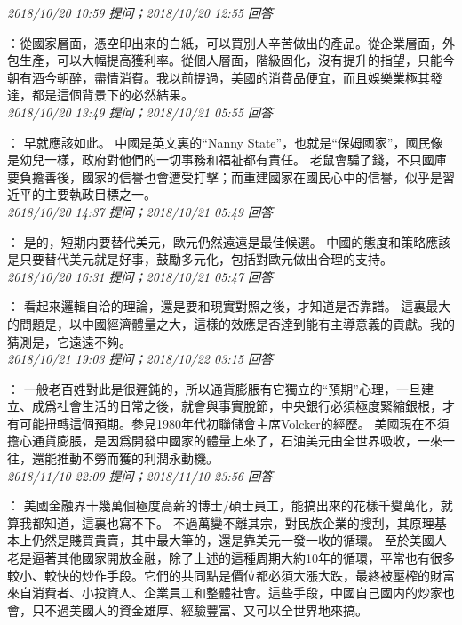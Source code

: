 \documentclass[twocolumn]{ctexart}
\begin{document}
\textit{\hfill\noindent\small 2018/10/20 10:59 提问；2018/10/20 12:55 回答}

：從國家層面，憑空印出來的白紙，可以買別人辛苦做出的產品。從企業層面，外包生產，可以大幅提高獲利率。從個人層面，階級固化，沒有提升的指望，只能今朝有酒今朝醉，盡情消費。我以前提過，美國的消費品便宜，而且娛樂業極其發達，都是這個背景下的必然結果。
\\

\textit{\hfill\noindent\small 2018/10/20 13:49 提问；2018/10/21 05:55 回答}

：
早就應該如此。
中國是英文裏的“Nanny State”，也就是“保姆國家”，國民像是幼兒一樣，政府對他們的一切事務和福祉都有責任。
老鼠會騙了錢，不只國庫要負擔善後，國家的信譽也會遭受打擊；而重建國家在國民心中的信譽，似乎是習近平的主要執政目標之一。
\\

\textit{\hfill\noindent\small 2018/10/20 14:37 提问；2018/10/21 05:49 回答}

：
是的，短期内要替代美元，歐元仍然遠遠是最佳候選。
中國的態度和策略應該是只要替代美元就是好事，鼓勵多元化，包括對歐元做出合理的支持。
\\

\textit{\hfill\noindent\small 2018/10/20 16:31 提问；2018/10/21 05:47 回答}

：
看起來邏輯自洽的理論，還是要和現實對照之後，才知道是否靠譜。
這裏最大的問題是，以中國經濟體量之大，這樣的效應是否達到能有主導意義的貢獻。我的猜測是，它遠遠不夠。
\\

\textit{\hfill\noindent\small 2018/10/21 19:03 提问；2018/10/22 03:15 回答}

：
一般老百姓對此是很遲鈍的，所以通貨膨脹有它獨立的“預期”心理，一旦建立、成爲社會生活的日常之後，就會與事實脫節，中央銀行必須極度緊縮銀根，才有可能扭轉這個預期。參見1980年代初聯儲會主席Volcker的經歷。
美國現在不須擔心通貨膨脹，是因爲開發中國家的體量上來了，石油美元由全世界吸收，一來一往，還能推動不勞而獲的利潤永動機。
\\

\textit{\hfill\noindent\small 2018/11/10 22:09 提问；2018/11/10 23:56 回答}

：
美國金融界十幾萬個極度高薪的博士/碩士員工，能搞出來的花樣千變萬化，就算我都知道，這裏也寫不下。
不過萬變不離其宗，對民族企業的搜刮，其原理基本上仍然是賤買貴賣，其中最大筆的，還是靠美元一發一收的循環。
至於美國人老是逼著其他國家開放金融，除了上述的這種周期大約10年的循環，平常也有很多較小、較快的炒作手段。它們的共同點是價位都必須大漲大跌，最終被壓榨的財富來自消費者、小投資人、企業員工和整體社會。這些手段，中國自己國内的炒家也會，只不過美國人的資金雄厚、經驗豐富、又可以全世界地來搞。
\\
\end{document}
